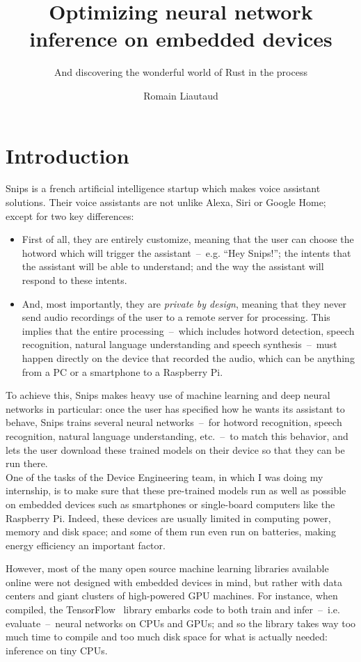 \documentclass[11pt]{article}
\title{Optimizing neural network inference on embedded devices}
\subtitle{And discovering the wonderful world of Rust in the process}
\author{Romain Liautaud}
\begin{document}


\section*{Introduction}

Snips is a french artificial intelligence startup which makes voice assistant solutions. Their voice assistants are not unlike Alexa, Siri or Google Home; except for two key differences:
\begin{itemize}
    \item First of all, they are entirely customize, meaning that the user can choose the hotword which will trigger the assistant~--~e.g. ``Hey Snips!''; the intents that the assistant will be able to understand; and the way the assistant will respond to these intents.
    
    \item And, most importantly, they are \textit{private by design}, meaning that they never send audio recordings of the user to a remote server for processing. This implies that the entire processing~--~which includes hotword detection, speech recognition, natural language understanding and speech synthesis~--~must happen directly on the device that recorded the audio, which can be anything from a PC or a smartphone to a Raspberry Pi.
\end{itemize}

To achieve this, Snips makes heavy use of machine learning and deep neural networks in particular: once the user has specified how he wants its assistant to behave, Snips trains several neural networks~--~for hotword recognition, speech recognition, natural language understanding, etc.~--~to match this behavior, and lets the user download these trained models on their device so that they can be run there.\\

One of the tasks of the Device Engineering team, in which I was doing my internship, is to make sure that these pre-trained models run as well as possible on embedded devices such as smartphones or single-board computers like the Raspberry Pi. Indeed, these devices are usually limited in computing power, memory and disk space; and some of them run even run on batteries, making energy efficiency an important factor.

However, most of the many open source machine learning libraries available online were not designed with embedded devices in mind, but rather with data centers and giant clusters of high-powered GPU machines. For instance, when compiled, the TensorFlow~\cite{tensorflow} library embarks code to both train and infer~--~i.e. evaluate~--~neural networks on CPUs and GPUs; and so the library takes way too much time to compile and too much disk space for what is actually needed: inference on tiny CPUs.\\
\end{document}
